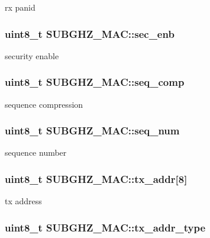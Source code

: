 rx panid \hypertarget{structSUBGHZ__MAC_a6de132110e9137708599c2aec3562b7b}{
\subsubsection[{sec\+\_\+enb}]{\setlength{\rightskip}{0pt plus 5cm}uint8\+\_\+t S\+U\+B\+G\+H\+Z\+\_\+\+M\+A\+C\+::sec\+\_\+enb}}\label{structSUBGHZ__MAC_a6de132110e9137708599c2aec3562b7b}
security enable \hypertarget{structSUBGHZ__MAC_a04a1c305bfb1962a6ad3d2da387fd83a}{
\subsubsection[{seq\+\_\+comp}]{\setlength{\rightskip}{0pt plus 5cm}uint8\+\_\+t S\+U\+B\+G\+H\+Z\+\_\+\+M\+A\+C\+::seq\+\_\+comp}}\label{structSUBGHZ__MAC_a04a1c305bfb1962a6ad3d2da387fd83a}
sequence compression \hypertarget{structSUBGHZ__MAC_ad684f6655aec7bb8029e1cff90480f39}{
\subsubsection[{seq\+\_\+num}]{\setlength{\rightskip}{0pt plus 5cm}uint8\+\_\+t S\+U\+B\+G\+H\+Z\+\_\+\+M\+A\+C\+::seq\+\_\+num}}\label{structSUBGHZ__MAC_ad684f6655aec7bb8029e1cff90480f39}
sequence number \hypertarget{structSUBGHZ__MAC_a3c436acb79ae6a41a6ae98a8ea1c1377}{
\subsubsection[{tx\+\_\+addr}]{\setlength{\rightskip}{0pt plus 5cm}uint8\+\_\+t S\+U\+B\+G\+H\+Z\+\_\+\+M\+A\+C\+::tx\+\_\+addr\mbox{[}8\mbox{]}}}\label{structSUBGHZ__MAC_a3c436acb79ae6a41a6ae98a8ea1c1377}
tx address \hypertarget{structSUBGHZ__MAC_ad3af27bc3e00a5359a6a042090733c82}{
\subsubsection[{tx\+\_\+addr\+\_\+type}]{\setlength{\rightskip}{0pt plus 5cm}uint8\+\_\+t S\+U\+B\+G\+H\+Z\+\_\+\+M\+A\+C\+::tx\+\_\+addr\+\_\+type}}\label{structSUBGHZ__MAC_ad3af27bc3e00a5359a6a042090733c82}
